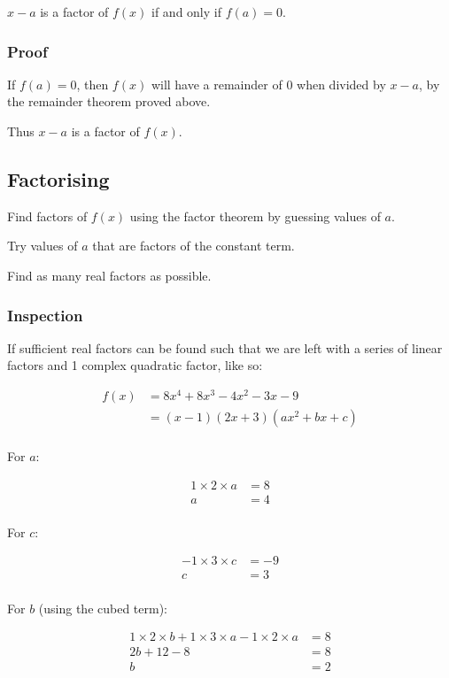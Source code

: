 \documentclass[a4paper,11pt]{article}
\begin{document}
$x - a$ is a factor of $f(x)$ if and only if $f(a) = 0$.


\subsubsection{Proof}

If $f(a) = 0$, then $f(x)$ will have a remainder of 0 when divided by $x - a$,
by the remainder theorem proved above.

Thus $x - a$ is a factor of $f(x)$.


\subsection{Factorising}

Find factors of $f(x)$ using the factor theorem by guessing values of $a$.

Try values of $a$ that are factors of the constant term.

Find as many real factors as possible.


\subsubsection{Inspection}

If sufficient real factors can be found such that we are left with a series of
linear factors and 1 complex quadratic factor, like so:

$$
\begin{aligned}
f(x) & = 8x^4 + 8x^3 - 4x^2 - 3x - 9 \\
& = (x - 1)(2x + 3)(ax^2 + bx + c) \\
\end{aligned}
$$

For $a$:

$$
\begin{aligned}
1 \times 2 \times a & = 8 \\
a & = 4 \\
\end{aligned}
$$

For $c$:

$$
\begin{aligned}
-1 \times 3 \times c & = -9 \\
c & = 3 \\
\end{aligned}
$$

For $b$ (using the cubed term):

$$
\begin{aligned}
1 \times 2 \times b + 1 \times 3 \times a - 1 \times 2 \times a & = 8 \\
2b + 12 - 8 & = 8 \\
b & = 2 \\
\end{aligned}
$$
\end{document}
